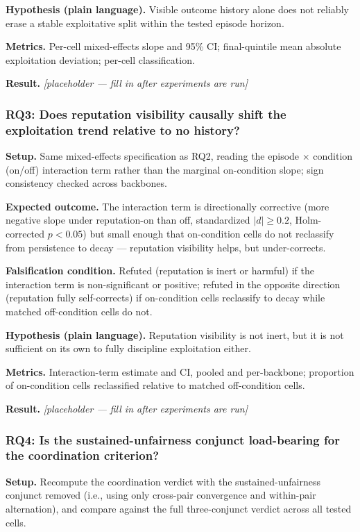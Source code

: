 \documentclass[11pt]{article}
\newcommand{\ph}{\textit{[placeholder --- fill in after experiments are run]}}
\begin{document}
\textbf{Hypothesis (plain language).} Visible outcome history alone does not reliably erase a stable exploitative split within the tested episode horizon.

\textbf{Metrics.} Per-cell mixed-effects slope and 95\% CI; final-quintile mean absolute exploitation deviation; per-cell classification.

\textbf{Result.} \ph

\subsubsection{RQ3: Does reputation visibility causally shift the exploitation trend relative to no history?}
\textbf{Setup.} Same mixed-effects specification as RQ2, reading the episode $\times$ condition (on/off) interaction term rather than the marginal on-condition slope; sign consistency checked across backbones.

\textbf{Expected outcome.} The interaction term is directionally corrective (more negative slope under reputation-on than off, standardized $|d| \geq 0.2$, Holm-corrected $p < 0.05$) but small enough that on-condition cells do not reclassify from persistence to decay --- reputation visibility helps, but under-corrects.

\textbf{Falsification condition.} Refuted (reputation is inert or harmful) if the interaction term is non-significant or positive; refuted in the opposite direction (reputation fully self-corrects) if on-condition cells reclassify to decay while matched off-condition cells do not.

\textbf{Hypothesis (plain language).} Reputation visibility is not inert, but it is not sufficient on its own to fully discipline exploitation either.

\textbf{Metrics.} Interaction-term estimate and CI, pooled and per-backbone; proportion of on-condition cells reclassified relative to matched off-condition cells.

\textbf{Result.} \ph

\subsubsection{RQ4: Is the sustained-unfairness conjunct load-bearing for the coordination criterion?}
\textbf{Setup.} Recompute the coordination verdict with the sustained-unfairness conjunct removed (i.e., using only cross-pair convergence and within-pair alternation), and compare against the full three-conjunct verdict across all tested cells.
\end{document}

